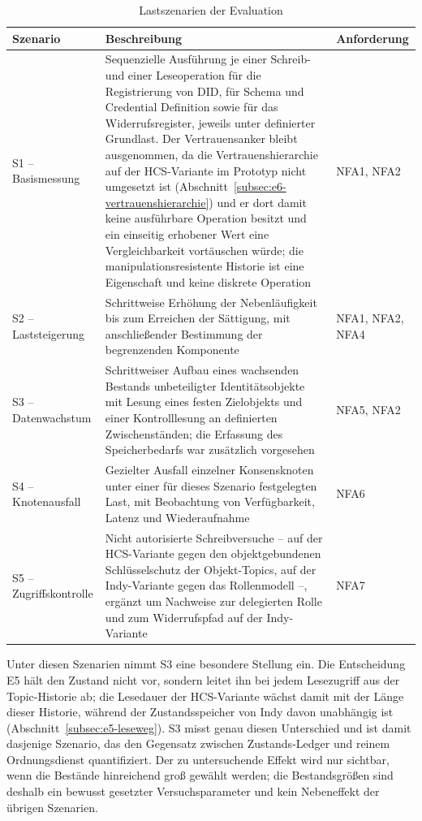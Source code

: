 \begin{table}[htbp]
\renewcommand{\arraystretch}{1.3}
\footnotesize
  \centering
  \caption{Lastszenarien der Evaluation}
  \label{tab:lastszenarien}
  \begin{tabular}{p{} p{} p{}}
    \toprule
    \textbf{Szenario} & \textbf{Beschreibung} & \textbf{Anforderung} \\
    \midrule
    S1 -- Basismessung & Sequenzielle Ausführung je einer Schreib- und einer Leseoperation für die Registrierung von DID, für Schema und Credential Definition sowie für das Widerrufsregister, jeweils unter definierter Grundlast. Der Vertrauensanker bleibt ausgenommen, da die Vertrauenshierarchie auf der HCS-Variante im Prototyp nicht umgesetzt ist (Abschnitt~\ref{subsec:e6-vertrauenshierarchie}) und er dort damit keine ausführbare Operation besitzt und ein einseitig erhobener Wert eine Vergleichbarkeit vortäuschen würde; die manipulationsresistente Historie ist eine Eigenschaft und keine diskrete Operation & NFA1, NFA2 \\
    S2 -- Laststeigerung & Schrittweise Erhöhung der Nebenläufigkeit bis zum Erreichen der Sättigung, mit anschließender Bestimmung der begrenzenden Komponente & NFA1, NFA2, NFA4 \\
    S3 -- Datenwachstum & Schrittweiser Aufbau eines wachsenden Bestands unbeteiligter Identitätsobjekte mit Lesung eines festen Zielobjekts und einer Kontrolllesung an definierten Zwischenständen; die Erfassung des Speicherbedarfs war zusätzlich vorgesehen & NFA5, NFA2 \\
    S4 -- Knotenausfall & Gezielter Ausfall einzelner Konsensknoten unter einer für dieses Szenario festgelegten Last, mit Beobachtung von Verfügbarkeit, Latenz und Wiederaufnahme & NFA6 \\
    S5 -- Zugriffskontrolle & Nicht autorisierte Schreibversuche -- auf der HCS-Variante gegen den objektgebundenen Schlüsselschutz der Objekt-Topics, auf der Indy-Variante gegen das Rollenmodell --, ergänzt um Nachweise zur delegierten Rolle und zum Widerrufspfad auf der Indy-Variante & NFA7 \\
    \bottomrule
  \end{tabular}
\end{table}

Unter diesen Szenarien nimmt S3 eine besondere Stellung ein. Die Entscheidung E5 hält den Zustand nicht vor, sondern leitet ihn bei jedem Lesezugriff aus der Topic-Historie ab; die Lesedauer der HCS-Variante wächst damit mit der Länge dieser Historie, während der Zustandsspeicher von Indy davon unabhängig ist (Abschnitt~\ref{subsec:e5-leseweg}). S3 misst genau diesen Unterschied und ist damit dasjenige Szenario, das den Gegensatz zwischen Zustands-Ledger und reinem Ordnungsdienst quantifiziert. Der zu untersuchende Effekt wird nur sichtbar, wenn die Bestände hinreichend groß gewählt werden; die Bestandsgrößen sind deshalb ein bewusst gesetzter Versuchsparameter und kein Nebeneffekt der übrigen Szenarien.

